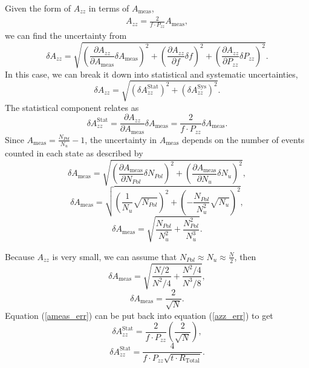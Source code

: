 \documentclass[11pt]{article}
\begin{document}
Given the form of $A_{zz}$ in terms of $A_{\mathrm{meas}}$, 
\begin{eqnarray}
A_{zz} = \frac{2  }{f \cdot P_{zz}}A_{\mathrm{meas}},
\end{eqnarray}
we can find the uncertainty from
\begin{equation}
\delta A_{zz} = \sqrt{\left( \frac{\partial A_{zz}}{\partial A_{\mathrm{meas}}} \delta A_{\mathrm{meas}} \right)^2 + \left( \frac{\partial A_{zz}}{\partial f} \delta f \right)^2 + \left( \frac{\partial A_{zz}}{\partial P_{zz}} \delta P_{zz} \right)^2 }.
\end{equation}
In this case, we can break it down into statistical and systematic uncertainties,
\begin{equation}
\delta A_{zz} = \sqrt{\left( \delta A_{zz}^{\mathrm{Stat}} \right) ^2 + \left( \delta A_{zz}^{\mathrm{Sys}} \right) ^2 }.
\label{azz_err}
\end{equation}
The statistical component relates as
\begin{equation}
\delta A_{zz}^{\mathrm{Stat}} = \frac{\partial A_{zz}}{\partial A_{\mathrm{meas}}} \delta A_{\mathrm{meas}} = \frac{2}{f\cdot P_{zz}} \delta A_{\mathrm{meas}}.
\end{equation}
Since $A_{\mathrm{meas}} = \frac{N_{Pol}}{N_u} - 1$, the uncertainty in $A_{\mathrm{meas}}$ depends on the number of events counted in each state as described by
\begin{equation}
\delta A_{\mathrm{meas}} = \sqrt{ \left( \frac{\partial A_{\mathrm{meas}}}{\partial N_{Pol}} \delta N_{Pol} \right)^2 + \left( \frac{\partial A_{\mathrm{meas}}}{\partial N_{u}} \delta N_{u} \right)^2 },
\end{equation}
\begin{equation}
\delta A_{\mathrm{meas}} = \sqrt{ \left( \frac{1}{N_u} \sqrt{N_{Pol}} \right)^2 + \left( -\frac{N_{Pol}}{N_u^2} \sqrt{N_u} \right)^2 },
\end{equation}
\begin{equation}
\delta A_{\mathrm{meas}} = \sqrt{  \frac{N_{Pol}}{N_u^2} + \frac{N_{Pol}^2}{N_u^3}  }.
\end{equation}

Because $A_{zz}$ is very small, we can assume that $N_{Pol} \approx N_u \approx \frac{N}{2}$, then
\begin{equation}
\delta A_{\mathrm{meas}} = \sqrt{  \frac{N/2}{N^2/4} + \frac{N^2/4}{N^3/8}  },
\end{equation}
\begin{equation}
\delta A_{\mathrm{meas}} = \frac{2}{\sqrt{N}}.
\label{ameas_err}
\end{equation}
Equation (\ref{ameas_err}) can be put back into equation (\ref{azz_err}) to get
\begin{equation}
\delta A_{zz}^{\mathrm{Stat}} = \frac{2}{f\cdot P_{zz}} \left( \frac{2}{\sqrt{N}} \right),
\end{equation}
\begin{equation}
\delta A_{zz}^{\mathrm{Stat}} = \frac{4}{f\cdot P_{zz}\sqrt{t\cdot R_{\mathrm{Total}}}}.
\end{equation}
\end{document}
